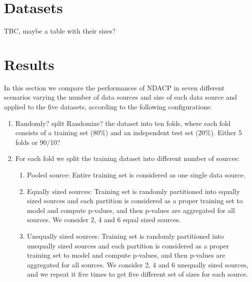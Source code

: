 \documentclass[main]{subfiles}
\newcommand{\todo}[1]{{\color{blue} #1 }}
\begin{document}
\section{Datasets}\label{sec:datasets}
TBC, maybe a table with their sizes?



\section{Results}\label{sec:results}
In this section we compare the performances of NDACP in seven different scenarios varying the number of data sources and size of each data source and applied to the five datasets, according to the following configurations: %
%
\begin{enumerate}

\item \todo{Randomly?} split \todo{Randomize?} the dataset into ten folds, where each fold consists of a training set (80\%) and an independent test set (20\%).  \todo{Either 5 folds or 90/10?}

\item For each fold we split the training dataset into different number of sources:
\begin{enumerate}
	\item Pooled source: Entire training set is considered as one single data source.
	\item Equally sized sources: Training set is randomly partitioned into equally sized sources and  each partition is considered as a proper training set to model and compute p-values, and then p-values are aggregated for all sources. We consider 2, 4 and 6 equal sized sources. %
	\item Unequally sized sources: Training set is randomly partitioned into unequally sized sources and  each partition is considered as a proper training set to model and compute p-values, and then p-values are aggregated for all sources. We consider 2, 4 and 6 unequally sized sources, and we repeat it five times to get five different set of sizes for each source.

\end{enumerate}

\end{enumerate}
\end{document}
